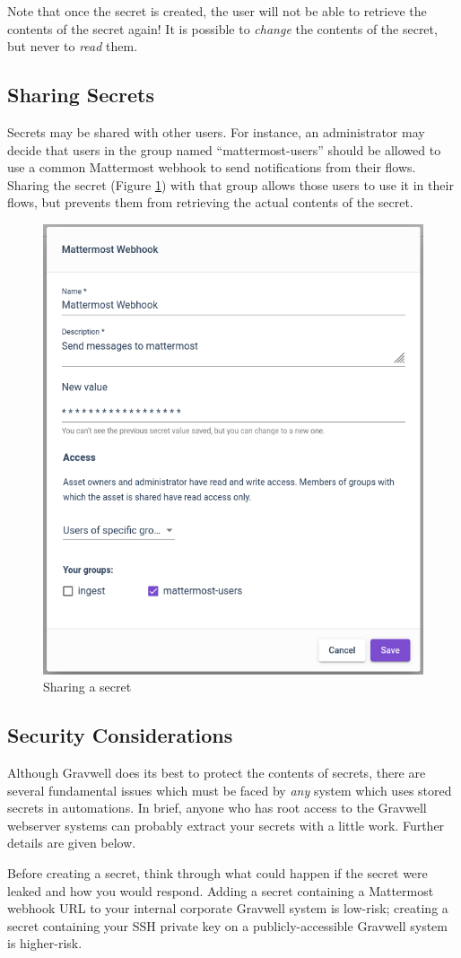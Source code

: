 Note that once the secret is created, the user will not be able to retrieve the contents of the secret again! It is possible to \emph{change} the contents of the secret, but never to \emph{read} them.

\subsection{Sharing Secrets}

Secrets may be shared with other users. For instance, an administrator may decide that users in the group named ``mattermost-users'' should be allowed to use a common Mattermost webhook to send notifications from their flows. Sharing the secret (Figure \ref{fig:secret-sharing}) with that group allows those users to use it in their flows, but prevents them from retrieving the actual contents of the secret.

\begin{figure}
	\includegraphics[width=0.5\linewidth]{images/secret-sharing.png}
	\caption{Sharing a secret}
	\label{fig:secret-sharing}
\end{figure}

\subsection{Security Considerations}

Although Gravwell does its best to protect the contents of secrets, there are several fundamental issues which must be faced by \emph{any} system which uses stored secrets in automations. In brief, anyone who has root access to the Gravwell webserver systems can probably extract your secrets with a little work. Further details are given below.

Before creating a secret, think through what could happen if the secret were leaked and how you would respond. Adding a secret containing a Mattermost webhook URL to your internal corporate Gravwell system is low-risk; creating a secret containing your SSH private key on a publicly-accessible Gravwell system is higher-risk.

